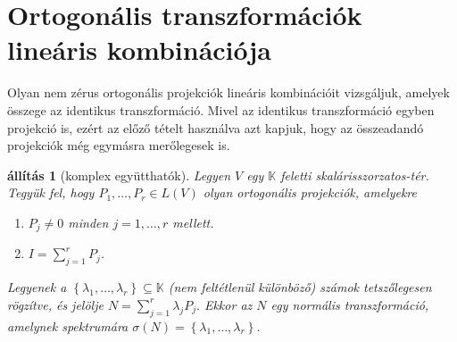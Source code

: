 \documentclass[9pt, a4paper, showtrims]{memoir}
\theoremstyle{plain}
\newtheorem{proposition}{állítás}[chapter]
\theoremstyle{remark}
\theoremstyle{definition}
\begin{document}
\section{Ortogonális transzformációk lineáris kombinációja}
Olyan nem zérus ortogonális projekciók lineáris kombinációit vizsgáljuk,
amelyek összege az identikus transzformáció. 
Mivel az identikus transzformáció egyben projekció is,
ezért az előző tételt használva azt kapjuk, hogy az összeadandó projekciók még egymásra merőlegesek is.
\begin{proposition}[komplex együtthatók]\label{pr:normlinkombkomplex}
    Legyen $V$ egy $\mathbb{K}$ feletti skalárisszorzatos-tér.
    Tegyük fel, hogy $P_1,\dots,P_r\in L\left( V \right)$ olyan ortogonális projekciók,
    amelyekre
    \begin{enumerate}
        \item $P_j\neq 0$ minden $j=1,\dots,r$ mellett.
        \item $I=\sum_{j=1}^rP_j$.
    \end{enumerate}
    Legyenek a $\left\{ \lambda_1,\dots,\lambda_r \right\}\subseteq \mathbb{K}$
    (nem feltétlenül különböző) számok tetszőlegesen rögzítve, és
    jelölje
    \(
        N
        =
        \sum_{j=1}^r\lambda_jP_j.
    \)
    Ekkor az $N$ egy \emph{normális} transzformáció, 
    amelynek spektrumára $\sigma\left( N \right)=\left\{ \lambda_1,\dots,\lambda_r \right\}$.
\end{proposition}
\end{document}
